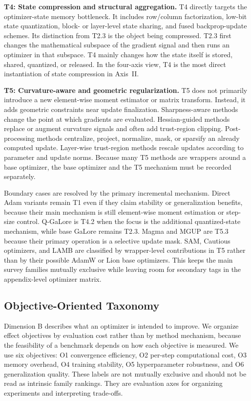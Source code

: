 \textbf{T4: State compression and structural aggregation.}
T4 directly targets the optimizer-state memory bottleneck.  It includes
row/column factorization, low-bit state quantization, block- or layer-level
state sharing, and fused backprop-update schemes.  Its distinction from T2.3
is the object being compressed.  T2.3 first changes the mathematical subspace
of the gradient signal and then runs an optimizer in that subspace.  T4 mainly
changes how the state itself is stored, shared, quantized, or released.  In
the four-axis view, T4 is the most direct instantiation of state compression in Axis~II.

\textbf{T5: Curvature-aware and geometric regularization.}
T5 does not primarily introduce a new element-wise moment estimator or matrix
transform.  Instead, it adds geometric constraints near update finalization.
Sharpness-aware methods change the point at which gradients are evaluated.
Hessian-guided methods replace or augment curvature signals and often add
trust-region clipping.  Post-processing methods centralize, project,
normalize, mask, or sparsify an already computed update.  Layer-wise
trust-region methods rescale updates according to parameter and update norms.
Because many T5 methods are wrappers around a base optimizer, the base
optimizer and the T5 mechanism must be recorded separately.

Boundary cases are resolved by the primary incremental mechanism.  Direct
Adam variants remain T1 even if they claim stability or generalization
benefits, because their main mechanism is still element-wise moment
estimation or step-size control.  Q-GaLore is T4.2 when the focus is the
additional quantized-state mechanism, while base GaLore remains T2.3.  Magma and MGUP are T5.3 because their primary operation is a selective
update mask.  SAM, Cautious optimizers, and
LAMB are classified by wrapper-level contributions in T5 rather than by their
possible AdamW or Lion base optimizers.  This keeps
the main survey families mutually exclusive while leaving room for secondary
tags in the appendix-level optimizer matrix.

\subsection{Objective-Oriented Taxonomy}
\label{sec:taxonomy-objective}

Dimension B describes what an optimizer is intended to improve.  We organize
effect objectives by evaluation cost rather than by method mechanism, because
the feasibility of a benchmark depends on how each objective is measured.  We
use six objectives: O1 convergence efficiency, O2 per-step computational
cost, O3 memory overhead, O4 training stability, O5 hyperparameter
robustness, and O6 generalization quality.  These labels are not mutually
exclusive and should not be read as intrinsic family rankings.  They are
evaluation axes for organizing experiments and interpreting trade-offs.

